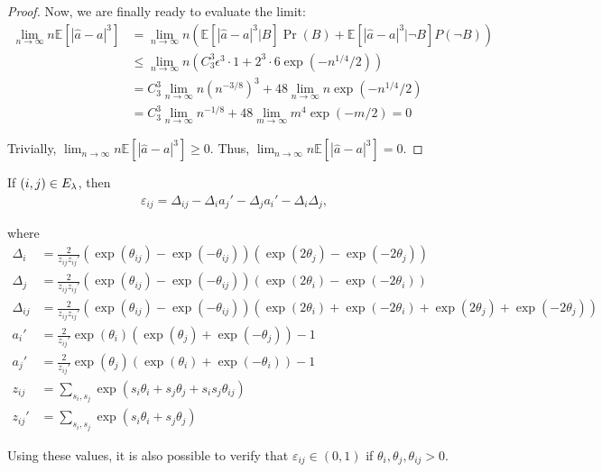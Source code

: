 \begin{proof}
Now, we are finally ready to evaluate the limit:
\begin{align}
    \lim_{n \rightarrow \infty} n \mathbb{E}[ |\hat{a} - a|^3 ] &= \lim_{n \rightarrow \infty} n \left( \mathbb{E}[ |\hat{a} - a|^3 | B] \Pr(B) + \mathbb{E}[ |\hat{a} - a|^3 | \neg B] P(\neg B) \right) \\
    &\leq \lim_{n \rightarrow \infty} n \left(C_3^3 \epsilon^3 \cdot 1 + 2^3 \cdot 6\exp(-n^{1/4}/2) \right) \\
    &= C_3^3 \lim_{n \rightarrow \infty} n (n^{-3/8})^3 + 48 \lim_{n \rightarrow \infty} n \exp(-n^{1/4}/2) \\
    &= C_3^3 \lim_{n \rightarrow \infty} n^{-1/8} + 48 \lim_{m \rightarrow \infty} m^4 \exp(-m/2) = 0
\end{align}

Trivially, $\lim_{n \rightarrow \infty} n \mathbb{E}[ |\hat{a} - a|^3 ] \geq 0$. Thus, $\lim_{n \rightarrow \infty} n \mathbb{E}[ |\hat{a} - a|^3 ] = 0$.
\end{proof}



\begin{lemma}
If $(i, j) \in E_{\lambda}$, then
\begin{align}
    \varepsilon_{ij} = \Delta_{ij} - \Delta_i a_j' - \Delta_j a_i' - \Delta_i \Delta_j,
\end{align}

where
\begin{align}
    \Delta_i &= \frac{2}{z_{ij} z_{ij}'} (\exp(\theta_{ij}) - \exp(-\theta_{ij})) (\exp(2\theta_j) - \exp(-2\theta_j)) \\
    \Delta_j &= \frac{2}{z_{ij} z_{ij}'} (\exp(\theta_{ij}) - \exp(-\theta_{ij})) (\exp(2\theta_i) - \exp(-2\theta_i)) \\
    \Delta_{ij} &= \frac{2}{z_{ij} z_{ij}'} (\exp(\theta_{ij}) - \exp(-\theta_{ij})) (\exp(2\theta_i) + \exp(-2\theta_i) + \exp(2\theta_j) + \exp(-2\theta_j)) \\
    a_i' &= \frac{2}{z_{ij}'} \exp(\theta_i) (\exp(\theta_j) + \exp(-\theta_j)) - 1 \\
    a_j' &= \frac{2}{z_{ij}'} \exp(\theta_j) (\exp(\theta_i) + \exp(-\theta_i)) - 1 \\
    z_{ij} &= \sum_{{s_i, s_j}} \exp(s_i \theta_i + s_j \theta_j + s_i s_j \theta_{ij}) \\
    z_{ij}' &=  \sum_{{s_i, s_j}} \exp(s_i \theta_i + s_j \theta_j)
\end{align}

Using these values, it is also possible to verify that $\varepsilon_{ij} \in (0, 1)$ if $\theta_i, \theta_j, \theta_{ij} > 0$.

\label{lemma:varepsilon}

\end{lemma}


